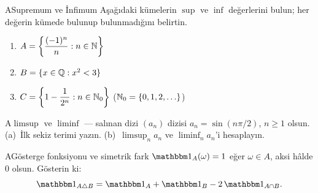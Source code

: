 \begin{alistirma}[Al.0.6]{A}{Supremum ve İnfimum}
Aşağıdaki kümelerin $\sup$ ve $\inf$ değerlerini bulun; her değerin kümede
bulunup bulunmadığını belirtin.
\begin{enumerate}[label=(\alph*)]
  \item $A = \left\{\dfrac{(-1)^n}{n} : n \in \mathbb{N}\right\}$
  \item $B = \{x \in \mathbb{Q} : x^2 < 3\}$
  \item $C = \left\{1 - \dfrac{1}{2^n} : n \in \mathbb{N}_0\right\}$
        ($\mathbb{N}_0 = \{0,1,2,\ldots\}$)
\end{enumerate}
\end{alistirma}

\begin{alistirma}[Al.0.7]{A}{$\limsup$ ve $\liminf$ --- salınan dizi}
$(a_n)$ dizisi $a_n = \sin(n\pi/2)$, $n \geq 1$ olsun.
(a)~İlk sekiz terimi yazın.
(b)~$\limsup_n a_n$ ve $\liminf_n a_n$'i hesaplayın.
\end{alistirma}

\begin{alistirma}[Al.0.8]{A}{Gösterge fonksiyonu ve simetrik fark}
$\gostf{A}(\omega) = 1$ eğer $\omega \in A$, aksi hâlde $0$ olsun.
Gösterin ki:
\[
  \gostf{A \triangle B} = \gostf{A} + \gostf{B} - 2\,\gostf{A \cap B}.
\]
\end{alistirma}

